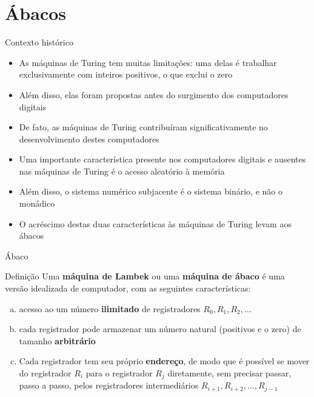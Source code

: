 \section{Ábacos}

\begin{frame}[fragile]{Contexto histórico}

    \begin{itemize}
        \item As máquinas de Turing tem muitas limitações: uma delas é trabalhar exclusivamente
            com inteiros positivos, o que exclui o zero

        \item Além disso, elas foram propostas antes do surgimento dos computadores digitais

        \item De fato, as máquinas de Turing contribuíram significativamente no desenvolvimento
            destes computadores

        \item Uma importante característica presente nos computadores digitais e ausentes nas
            máquinas de Turing é o acesso aleatório à memória

        \item Além disso, o sistema numérico subjacente é o sistema binário, e não o monádico

        \item O acréscimo destas duas características às máquinas de Turing levam aos ábacos
    \end{itemize}

\end{frame}

\begin{frame}[fragile]{Ábaco}

    \begin{block}{Definição}
        Uma \textbf{máquina de Lambek} ou uma \textbf{máquina de ábaco} é uma versão idealizada
        de computador, com as seguintes características:
        \begin{enumerate}[(a)]
            \item acesso ao um número \textbf{ilimitado} de registradores $R_0, R_1, R_2, \ldots$
            \item cada registrador pode armazenar um número natural (positivos e o zero) de tamanho
                \textbf{arbitrário}
            \item Cada registrador tem seu próprio \textbf{endereço}, de modo que é possível se 
                mover do registrador $R_i$ para o registrador $R_j$ diretamente, sem precisar 
                passar, passo a passo, pelos registradores intermediários 
                $R_{i + 1}, R_{i + 2}, \ldots, R_{j - 1}$
        \end{enumerate}
    \end{block}

\end{frame}

